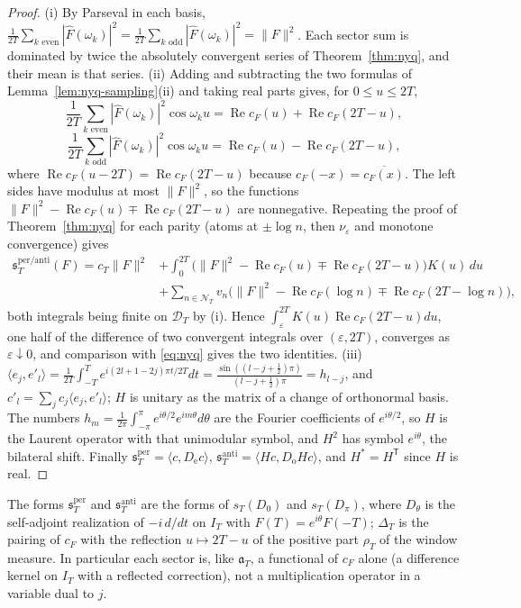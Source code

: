 \documentclass[11pt]{amsart}
\theoremstyle{definition}
\theoremstyle{remark}
\newcommand{\Rel}{\operatorname{Re}}
\newcommand{\IT}{I_T}
\newcommand{\Fh}{\widehat F}
\newcommand{\cF}{c_F}
\newcommand{\NT}{\mathcal N_T}
\begin{document}
\begin{proof}
(i) By Parseval in each basis, $\frac1{2T}\sum_{k\text{ even}}|\Fh(\omega_k)|^2=\frac1{2T}\sum_{k\text{ odd}}|\Fh(\omega_k)|^2=\|F\|^2$.
Each sector sum is dominated by twice the absolutely convergent series of Theorem~\ref{thm:nyq}, and their mean is
that series.
(ii) Adding and subtracting the two formulas of Lemma~\ref{lem:nyq-sampling}(ii) and taking real parts gives, for
$0\le u\le2T$,
\[
\frac1{2T}\sum_{k\text{ even}}|\Fh(\omega_k)|^2\cos\omega_ku=\Rel\cF(u)+\Rel\cF(2T-u),\]\[
\frac1{2T}\sum_{k\text{ odd}}|\Fh(\omega_k)|^2\cos\omega_ku=\Rel\cF(u)-\Rel\cF(2T-u),
\]
where $\Rel\cF(u-2T)=\Rel\cF(2T-u)$ because $\cF(-x)=\overline{\cF(x)}$. The left sides have modulus at most $\|F\|^2$,
so the functions $\|F\|^2-\Rel\cF(u)\mp\Rel\cF(2T-u)$ are nonnegative. Repeating the proof of Theorem~\ref{thm:nyq}
for each parity (atoms at $\pm\log n$, then $\nu_\varepsilon$ and monotone convergence) gives
\begin{align*}
\mathfrak s^{\mathrm{per}/\mathrm{anti}}_T(F)=c_T\|F\|^2&+\int_0^{2T}\big(\|F\|^2-\Rel\cF(u)\mp\Rel\cF(2T-u)\big)K(u)\,du\\
&+\sum_{n\in\NT}v_n\big(\|F\|^2-\Rel\cF(\log n)\mp\Rel\cF(2T-\log n)\big),
\end{align*}
both integrals being finite on $\mathcal D_T$ by (i). Hence $\int_\varepsilon^{2T}K(u)\Rel\cF(2T-u)du$, one half of the
difference of two convergent integrals over $(\varepsilon,2T)$, converges as $\varepsilon\downarrow0$, and comparison
with \eqref{eq:nyq} gives the two identities.
(iii) $\langle e_j,e'_l\rangle=\frac1{2T}\int_{-T}^Te^{i(2l+1-2j)\pi t/2T}dt=\frac{\sin((l-j+\frac12)\pi)}{(l-j+\frac12)\pi}=h_{l-j}$,
and $c'_l=\sum_jc_j\langle e_j,e'_l\rangle$; $H$ is unitary as the matrix of a change of orthonormal basis. The numbers
$h_m=\frac1{2\pi}\int_{-\pi}^\pi e^{i\theta/2}e^{im\theta}d\theta$ are the Fourier coefficients of $e^{i\theta/2}$, so $H$ is
the Laurent operator with that unimodular symbol, and $H^2$ has symbol $e^{i\theta}$, the bilateral shift. Finally
$\mathfrak s^{\mathrm{per}}_T=\langle c,D_{\mathrm e}c\rangle$, $\mathfrak s^{\mathrm{anti}}_T=\langle Hc,D_{\mathrm o}Hc\rangle$, and
$H^*=H^{\mathsf T}$ since $H$ is real.
\end{proof}

The forms $\mathfrak s^{\mathrm{per}}_T$ and $\mathfrak s^{\mathrm{anti}}_T$ are the forms of $s_T(D_0)$ and
$s_T(D_\pi)$, where $D_\theta$ is the self-adjoint realization of $-i\,d/dt$ on $\IT$ with $F(T)=e^{i\theta}F(-T)$;
$\Delta_T$ is the pairing of $\cF$ with the reflection $u\mapsto2T-u$ of the positive part $\rho_T$ of the window
measure. In particular each sector is, like $\mathfrak a_T$, a functional of $\cF$ alone (a difference kernel on
$\IT$ with a reflected correction), not a multiplication operator in a variable dual to $j$.
\end{document}
